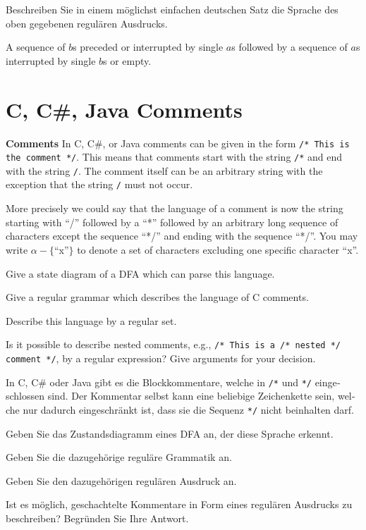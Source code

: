 \documentclass[a4paper]{exam}
\theoremstyle{remark}
\begin{document}
\begin{questions}
\begin{otherlanguage}{german}
	Beschreiben Sie in einem möglichst einfachen deutschen Satz die Sprache des oben gegebenen regulären Ausdrucks.
\end{otherlanguage}

\begin{solution}
A sequence of $b$s preceded or interrupted by single $a$s followed by a sequence of $a$s interrupted by single $b$s or empty.
\end{solution}

\section{C, C\#, Java Comments}
\question
	\textbf{Comments}
		In C, C\#, or Java comments can be given in the form {\tt /* This is the comment */}. This means that comments start
		with the string {\tt /*} and end with the string {\tt */}. The comment itself can be an arbitrary string with the exception that
		the string {\tt */} must not occur.
		
		More precisely we could say that the language of a comment is now the string starting with ``/'' followed by a ``*'' followed by an arbitrary long sequence of characters except the sequence ``*/'' and ending with the sequence ``*/''. You may write $\alpha - \{$``x''$\}$ to denote a set of characters excluding one specific character ``x''.
		
\begin{parts}
	\item Give a state diagram of a DFA which can parse this language.
	\item Give a regular grammar which describes the language of C comments.
	\item Describe this language by a regular set.
	\item Is it possible to describe nested comments, e.g., {\tt /* This is a /* nested */ comment */}, by a regular expression? Give arguments for your decision.
\end{parts}
		
\begin{otherlanguage}{german}
In C, C\# oder Java gibt es die Blockkommentare, welche in \verb$/*$ und \verb$*/$ eingeschlossen sind. Der Kommentar selbst kann eine beliebige Zeichenkette sein, welche nur dadurch eingeschränkt ist, dass sie die Sequenz \verb$*/$ nicht beinhalten darf.

\begin{parts}
	\item Geben Sie das Zustandsdiagramm eines DFA an, der diese Sprache erkennt.
	\item Geben Sie die dazugehörige reguläre Grammatik an.
	\item Geben Sie den dazugehörigen regulären Ausdruck an.
	\item Ist es möglich, geschachtelte Kommentare in Form eines regulären Ausdrucks zu beschreiben? Begründen Sie Ihre Antwort.
\end{parts}


\end{otherlanguage}
\end{questions}
\end{document}
